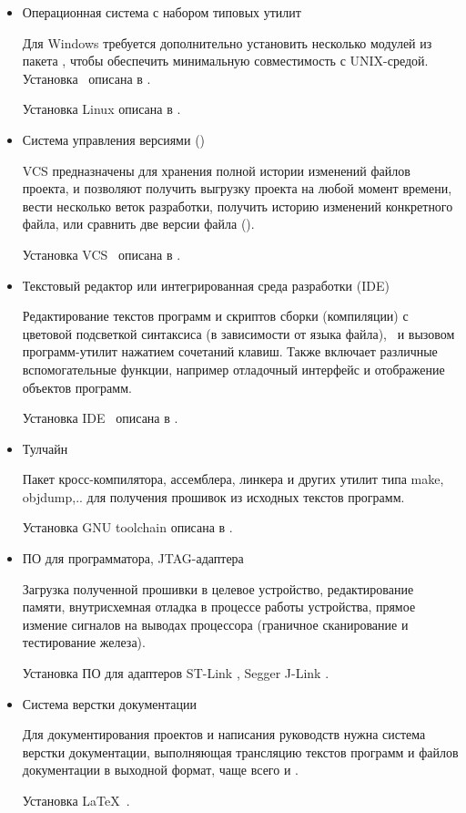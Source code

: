 
\begin{itemize}
  \item Операционная система с набором типовых утилит
  
  Для Windows требуется дополнительно установить несколько модулей из пакета
  , чтобы обеспечить минимальную совместимость с UNIX-средой.
  Установка \ описана в .
  
  Установка Linux описана в .
  
  \item Система управления версиями ()
  
  VCS предназначены для хранения полной истории изменений файлов проекта, и
  позволяют получить выгрузку проекта на любой момент времени, вести несколько
  веток разработки, получить историю изменений конкретного файла, или сравнить
  две версии файла ().
  
  Установка VCS \git\ описана в .
  
  \item Текстовый редактор или интегрированная среда разработки (IDE)
  
  Редактирование текстов программ и скриптов сборки (компиляции) с
  цветовой подсветкой синтаксиса (в зависимости от языка файла),
  \ и вызовом программ-утилит нажатием сочетаний 
  клавиш. Также включает различные вспомогательные функции, например
  отладочный интерфейс и отображение объектов программ.
  
  Установка IDE \eclipse\ описана в .
  
  \item Тулчайн
  
  Пакет кросс-компилятора, ассемблера, линкера и других утилит типа make,
  objdump,.. для получения прошивок из исходных текстов программ.
  
  Установка GNU toolchain описана в .
  
  \item ПО для программатора, JTAG-адаптера
  
  Загрузка полученной прошивки в целевое устройство, редактирование памяти, 
  внутрисхемная отладка в процессе работы устройства, прямое измение сигналов на
  выводах процессора (граничное сканирование и тестирование железа).
  
  Установка ПО для адаптеров ST-Link , Segger J-Link
  .
  
  \item Система верстки документации
  
  Для документирования проектов и написания руководств нужна система верстки
  документации, выполняющая трансляцию текстов программ и файлов 
  документации в выходной формат, чаще всего  и .
  
  Установка \LaTeX\ .
  
\end{itemize}

